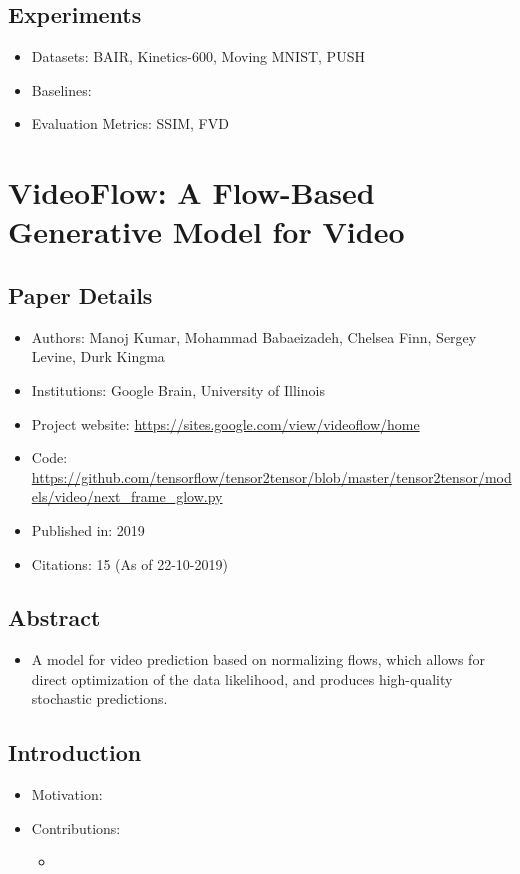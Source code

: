 \documentclass{article}
\begin{document}
    \subsection{Experiments}\label{subsec:Scaling_Autoregressive_Video_Models:experiments}
    \begin{itemize}
        \item Datasets: BAIR, Kinetics-600, Moving MNIST, PUSH
        \item Baselines:
        \item Evaluation Metrics: SSIM, FVD
    \end{itemize}
    \newpage


    \section{VideoFlow: A Flow-Based Generative Model for Video}\label{sec:VideoFlow_A_Flow_Based_Generative_Model_for_Video}
    \subsection*{Paper Details}
    \begin{itemize}
        \item Authors: Manoj Kumar, Mohammad Babaeizadeh, Chelsea Finn, Sergey Levine, Durk Kingma
        \item Institutions: Google Brain, University of Illinois
        \item Project website: \url{https://sites.google.com/view/videoflow/home}
        \item Code: \url{https://github.com/tensorflow/tensor2tensor/blob/master/tensor2tensor/models/video/next_frame_glow.py}
        \item Published in: 2019
        \item Citations: 15 (As of 22-10-2019)
    \end{itemize}

    \subsection*{Abstract}
    \begin{itemize}
        \item A model for video prediction based on normalizing flows, which allows for direct optimization of the data likelihood, and produces high-quality stochastic predictions.
    \end{itemize}

    \subsection{Introduction}\label{subsec:VideoFlow_A_Flow_Based_Generative_Model_for_Video:introduction}
    \begin{itemize}
        \item Motivation:
        \item Contributions:
        \begin{itemize}
            \item
        \end{itemize}
    \end{itemize}
\end{document}
